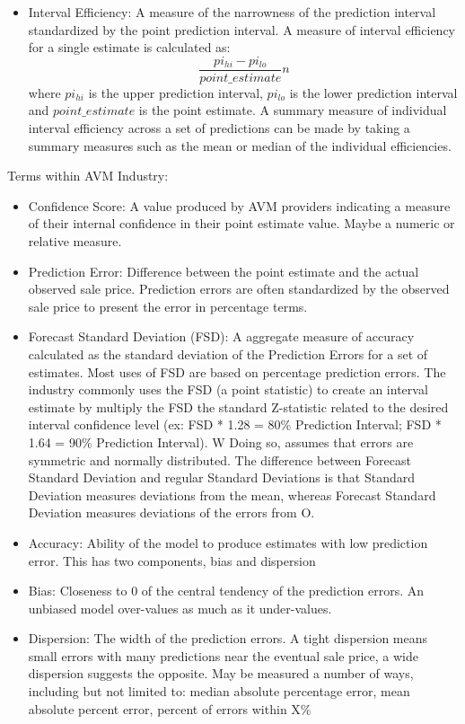 \documentclass[colTwo]{anon}
\theoremstyle{definition}
\begin{document}
\begin{itemize}
\item Interval Efficiency: A measure of the narrowness of the prediction interval standardized by the point prediction interval. A measure of interval efficiency for a single estimate is calculated as: 
\[\frac{pi_{hi} - pi_{lo}}{point\_estimate}{n}\] where \(pi_{hi}\) is the upper prediction interval, \(pi_{lo}\) is the lower prediction interval and \(point\_estimate\) is the point estimate. A summary measure of individual interval efficiency across a set of predictions can be made by taking a summary measures such as the mean or median of the individual efficiencies.

\end{itemize}

Terms within AVM Industry:

\begin{itemize}
\item Confidence Score: A value produced by AVM providers indicating a measure of their internal confidence in their point estimate value.  Maybe a numeric or relative measure. 
\item Prediction Error: Difference between the point estimate and the actual observed sale price. Prediction errors are often standardized by the observed sale price to present the error in percentage terms.
\item Forecast Standard Deviation (FSD):  A aggregate measure of accuracy calculated as the standard deviation of the Prediction Errors for a set of estimates. Most uses of FSD are based on percentage prediction errors. The industry commonly uses the FSD (a point statistic) to create an interval estimate by multiply the FSD the standard Z-statistic related to the desired interval confidence level (ex: FSD * 1.28 = 80\% Prediction Interval; FSD * 1.64 = 90\% Prediction Interval). W Doing so, assumes that errors are symmetric and normally distributed. The difference between Forecast Standard Deviation and regular Standard Deviations is that Standard Deviation measures deviations from the mean, whereas Forecast Standard Deviation measures deviations of the errors from O.
\item Accuracy: Ability of the model to produce estimates with low prediction error.  This has two components, bias and dispersion
\item Bias: Closeness to 0 of the central tendency of the prediction errors.  An unbiased model over-values as much as it under-values.  
\item Dispersion: The width of the prediction errors.  A tight dispersion means small errors with many predictions near the eventual sale price, a wide dispersion suggests the opposite.  May be measured a number of ways, including but not limited to: median absolute percentage error, mean absolute percent error, percent of errors within X\%
\end{itemize}
\end{document}
